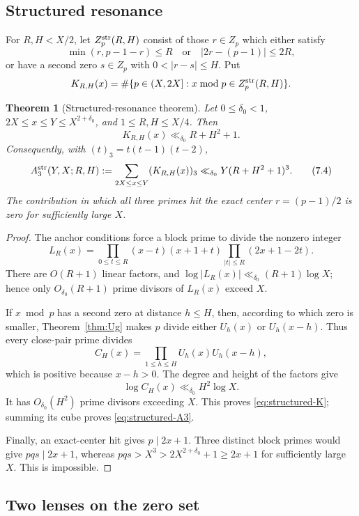 \documentclass[11pt]{amsart}
\theoremstyle{plain}
\newtheorem{theorem}{Theorem}
\theoremstyle{remark}
\begin{document}
\subsection{Structured resonance}

For $R,H<X/2$, let $Z_p^{\rm str}(R,H)$ consist of those $r\in Z_p$
which either satisfy
\[
 \min(r,p-1-r)\leq R
 \quad\text{or}\quad
 |2r-(p-1)|\leq2R,
 \tag{7.2}\label{eq:anchors}
\]
or have a second zero $s\in Z_p$ with $0<|r-s|\leq H$.  Put
\[
 K_{R,H}(x)=\#\{p\in(X,2X]:x\bmod p\in Z_p^{\rm str}(R,H)\}.
\]

\begin{theorem}[Structured-resonance theorem]
\label{thm:structured-resonance}
Let $0\leq\delta_0<1$, $2X\leq x\leq Y\leq X^{2+\delta_0}$, and
$1\leq R,H\leq X/4$.  Then
\[
 K_{R,H}(x)\ll_{\delta_0}R+H^2+1.
 \tag{7.3}\label{eq:structured-K}
\]
Consequently, with $(t)_3=t(t-1)(t-2)$,
\[
 A_3^{\rm str}(Y,X;R,H)
 :=\sum_{2X\leq x\leq Y}(K_{R,H}(x))_3
 \ll_{\delta_0}Y(R+H^2+1)^3.
 \tag{7.4}\label{eq:structured-A3}
\]
The contribution in which all three primes hit the exact center
$r=(p-1)/2$ is zero for sufficiently large $X$.
\end{theorem}

\begin{proof}
The anchor conditions force a block prime to divide the nonzero integer
\[
 L_R(x)=
 \prod_{0\leq t\leq R}(x-t)(x+1+t)
 \prod_{|t|\leq R}(2x+1-2t).
\]
There are $O(R+1)$ linear factors, and
$\log|L_R(x)|\ll_{\delta_0}(R+1)\log X$; hence only
$O_{\delta_0}(R+1)$ prime divisors of $L_R(x)$ exceed $X$.

If $x\bmod p$ has a second zero at distance $h\leq H$, then, according
to which zero is smaller, Theorem~\ref{thm:Ug} makes $p$ divide either
$U_h(x)$ or $U_h(x-h)$.  Thus every close-pair prime divides
\[
 C_H(x)=\prod_{1\leq h\leq H}U_h(x)U_h(x-h),
\]
which is positive because $x-h>0$.  The degree and height of the
factors give
\[
 \log C_H(x)\ll_{\delta_0}H^2\log X.
\]
It has $O_{\delta_0}(H^2)$ prime divisors exceeding $X$.  This proves
\eqref{eq:structured-K}; summing its cube proves
\eqref{eq:structured-A3}.

Finally, an exact-center hit gives $p\mid2x+1$.  Three distinct block
primes would give $pqs\mid2x+1$, whereas
$pqs>X^3>2X^{2+\delta_0}+1\geq2x+1$ for sufficiently large $X$.
This is impossible.
\end{proof}

\subsection{Two lenses on the zero set}
\end{document}
